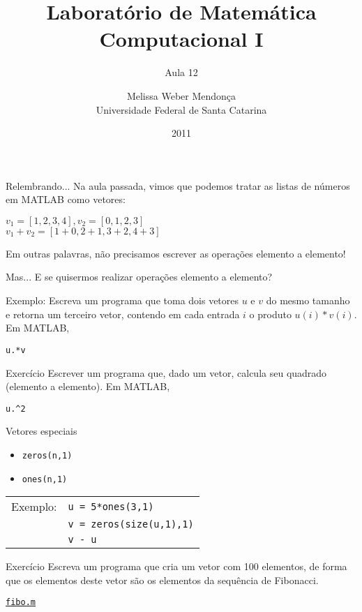 \documentclass[hyperref={pdfpagelabels=false}]{beamer}
\title{Laboratório de Matemática Computacional I}
\subtitle{Aula 12}
\author[M. Weber Mendonça]{Melissa Weber Mendonça\\
Universidade Federal de Santa Catarina}
\date{2011}
\begin{document}
\setmonofont{Inconsolata}

\begin{frame}
  \titlepage
\end{frame}

\begin{frame}{Relembrando...}
	Na aula passada, vimos que podemos tratar as listas de números em MATLAB como vetores:
	\begin{center}
	  $v_1 = [1,2,3,4], v_2 = [0,1,2,3]$\\
	  $v_1+v_2 = [1+0,2+1,3+2,4+3]$
	\end{center}
	Em outras palavras, não precisamos escrever as operações elemento a elemento!
\end{frame}

\begin{frame}{Mas...}
  E se quisermos realizar operações elemento a elemento?
  
  Exemplo: Escreva um programa que toma dois vetores $u$ e $v$ do mesmo tamanho e retorna um terceiro vetor, contendo em cada entrada $i$ o produto $u(i)*v(i)$.
  \vfill Em MATLAB, \\ \begin{center}{\texttt{u.*v}}\end{center}
\end{frame}

\begin{frame}{Exercício}
  Escrever um programa que, dado um vetor, calcula seu quadrado (elemento a elemento).
  \vfill Em MATLAB, \\ \begin{center}{\texttt{u.\^{}2}}\end{center}
\end{frame}

\begin{frame}{Vetores especiais}
  \begin{itemize}
  \item[] {\texttt{zeros(n,1)}}
  \item[] {\texttt{ones(n,1)}}
  \end{itemize}
  \vfill
  \begin{tabular}{r l}
    Exemplo: &{\texttt{u = 5*ones(3,1)}}\\
    &{\texttt{v = zeros(size(u,1),1)}}\\
    &{\texttt{v - u}}
  \end{tabular}
\end{frame}

\begin{frame}{Exercício}
  Escreva um programa que cria um vetor com 100 elementos, de forma que os elementos deste vetor são os elementos da sequência de Fibonacci.  
	\begin{center} \href{listings/fibo.m}{\underline{\texttt{fibo.m}}} \end{center}
\end{frame}
\end{document}
